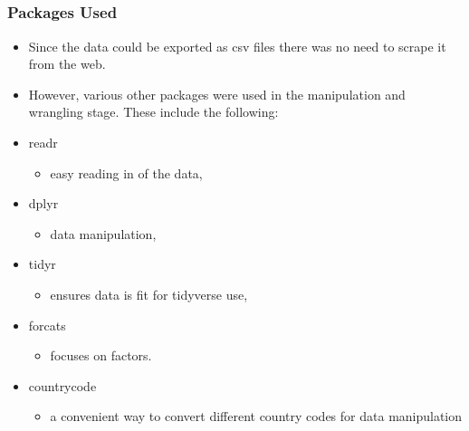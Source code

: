 \documentclass[handout, xcolor=dvipsnames]{beamer}
\begin{document}
\subsection{}
\begin{frame}
	\frametitle{Packages Used}
	\begin{itemize}
    	\item Since the data could be exported as csv files there was no need to scrape it from the web.
    	\item However, various other packages were used in the manipulation and wrangling stage. These include the following: 
            \item readr 
            \begin{itemize}
                \item easy reading in of the data,
            \end{itemize}
            \item dplyr 
            \begin{itemize}
                \item data manipulation,
            \end{itemize}
            \item tidyr 
            \begin{itemize}
                \item ensures data is fit for tidyverse use,
            \end{itemize}
            \item forcats 
            \begin{itemize}
                \item focuses on factors.
            \end{itemize}
    	\item countrycode 
        \begin{itemize}
                \item a convenient way to convert different country codes for data manipulation
        \end{itemize}
    \end{itemize}
\end{frame}
\end{document}
